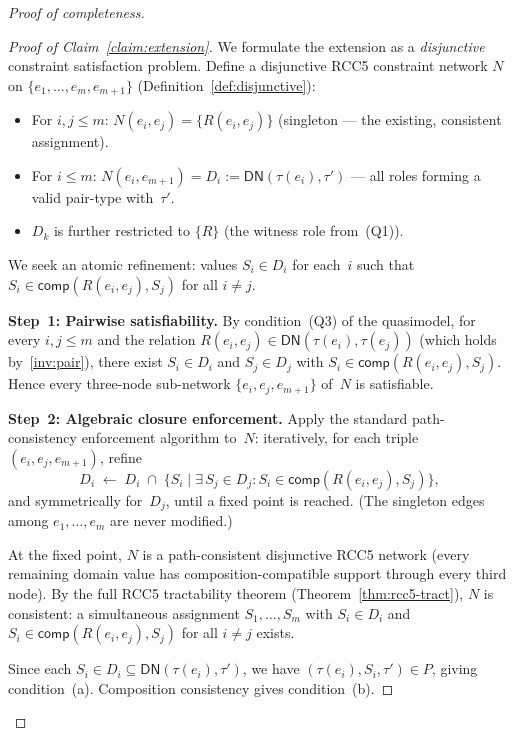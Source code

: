\documentclass[a4paper,11pt]{article}
\theoremstyle{definition}
\newcommand{\comp}{\ensuremath{\mathsf{comp}}}
\begin{document}
\begin{proof}[Proof of completeness]
\begin{proof}[Proof of Claim~\ref{claim:extension}]
We formulate the extension as a \emph{disjunctive} constraint
satisfaction problem.  Define a disjunctive RCC5 constraint network
$N$ on $\{e_1, \ldots, e_m, e_{m+1}\}$
(Definition~\ref{def:disjunctive}):
\begin{itemize}[nosep]
  \item For $i,j \leq m$: $N(e_i, e_j) = \{R(e_i, e_j)\}$
    (singleton --- the existing, consistent assignment).
  \item For $i \leq m$: $N(e_i, e_{m+1}) = D_i :=
    \mathsf{DN}(\tau(e_i), \tau')$ --- all roles forming a valid
    pair-type with~$\tau'$.
  \item $D_k$ is further restricted to $\{R\}$ (the witness role
    from~(Q1)).
\end{itemize}

We seek an atomic refinement: values $S_i \in D_i$ for each~$i$
such that $S_i \in \comp(R(e_i, e_j), S_j)$ for all $i \neq j$.

\smallskip\noindent
\textbf{Step~1: Pairwise satisfiability.}\;
By condition~(Q3) of the quasimodel, for every $i,j \leq m$ and the
relation $R(e_i, e_j) \in \mathsf{DN}(\tau(e_i), \tau(e_j))$ (which
holds by~\ref{inv:pair}), there exist $S_i \in D_i$ and $S_j \in D_j$
with $S_i \in \comp(R(e_i, e_j), S_j)$.  Hence every three-node
sub-network $\{e_i, e_j, e_{m+1}\}$ of~$N$ is satisfiable.

\smallskip\noindent
\textbf{Step~2: Algebraic closure enforcement.}\;
Apply the standard path-consistency enforcement algorithm to~$N$:
iteratively, for each triple $(e_i, e_j, e_{m+1})$, refine
\[
  D_i \;\leftarrow\; D_i \;\cap\;
  \bigl\{S_i \mid \exists\, S_j \in D_j \colon
  S_i \in \comp(R(e_i, e_j), S_j)\bigr\},
\]
and symmetrically for~$D_j$, until a fixed point is reached.
(The singleton edges among $e_1, \ldots, e_m$ are never modified.)

At the fixed point, $N$ is a path-consistent disjunctive RCC5
network (every remaining domain value has composition-compatible
support through every third node).  By the full RCC5 tractability
theorem (Theorem~\ref{thm:rcc5-tract}), $N$ is consistent: a
simultaneous assignment $S_1, \ldots, S_m$ with $S_i \in D_i$ and
$S_i \in \comp(R(e_i, e_j), S_j)$ for all $i \neq j$ exists.

Since each $S_i \in D_i \subseteq \mathsf{DN}(\tau(e_i), \tau')$,
we have $(\tau(e_i), S_i, \tau') \in P$, giving condition~(a).
Composition consistency gives condition~(b).


\end{proof}
\end{proof}
\end{document}

